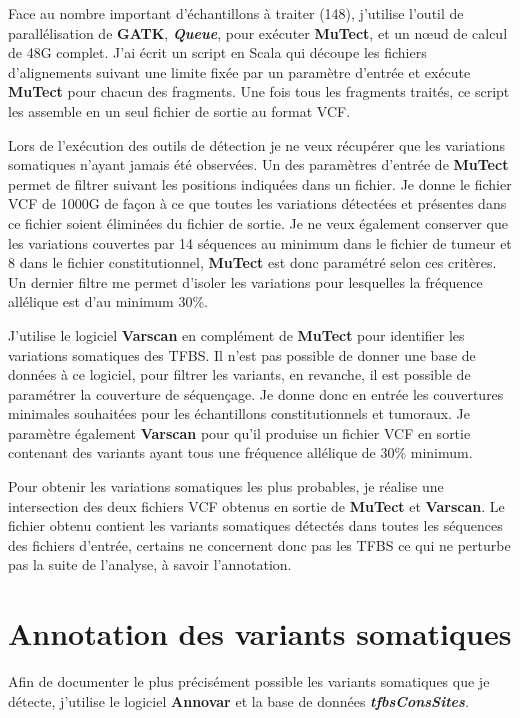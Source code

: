Face au nombre important d'échantillons à traiter (148), j'utilise l'outil de parallélisation de \textbf{GATK}, \textit{\textbf{Queue}}, pour exécuter \textbf{MuTect}, et un nœud de calcul de 48G complet. J'ai écrit un script en Scala qui découpe les fichiers d'alignements suivant une limite fixée par un paramètre d'entrée et exécute \textbf{MuTect} pour chacun des fragments. Une fois tous les fragments traités, ce script les assemble en un seul fichier de sortie au format VCF.

Lors de l'exécution des outils de détection je ne veux récupérer que les variations somatiques n'ayant jamais été observées. Un des paramètres d'entrée de \textbf{MuTect} permet de filtrer suivant les positions indiquées dans un fichier. Je donne le fichier VCF de 1000G de façon à ce que toutes les variations détectées et présentes dans ce fichier soient éliminées du fichier de sortie. Je ne veux également conserver que les variations couvertes par 14 séquences au minimum dans le fichier de tumeur et 8 dans le fichier constitutionnel, \textbf{MuTect} est donc paramétré selon ces critères. Un dernier filtre me permet d'isoler les variations pour lesquelles la fréquence allélique est d'au minimum 30\%.

J'utilise le logiciel \textbf{Varscan} en complément de \textbf{MuTect} pour identifier les variations somatiques des TFBS. Il n'est pas possible de donner une base de données à ce logiciel, pour filtrer les variants, en revanche, il est possible de paramétrer la couverture de séquençage. Je donne donc en entrée les couvertures minimales souhaitées pour les échantillons constitutionnels et tumoraux. Je paramètre également \textbf{Varscan} pour qu'il produise un fichier VCF en sortie contenant des variants ayant tous une fréquence allélique de 30\% minimum.

Pour obtenir les variations somatiques les plus probables, je réalise une  intersection des deux fichiers VCF obtenus en sortie de \textbf{MuTect} et \textbf{Varscan}. Le fichier obtenu contient les variants somatiques détectés dans toutes les séquences des fichiers d'entrée, certains ne concernent donc pas les TFBS ce qui ne perturbe pas la suite de l'analyse, à savoir l'annotation.

\newpage
\section{Annotation des variants somatiques}

Afin de documenter le plus précisément possible les variants somatiques que je détecte, j'utilise le logiciel \textbf{Annovar} et la base de données \textit{\textbf{tfbsConsSites}}.

